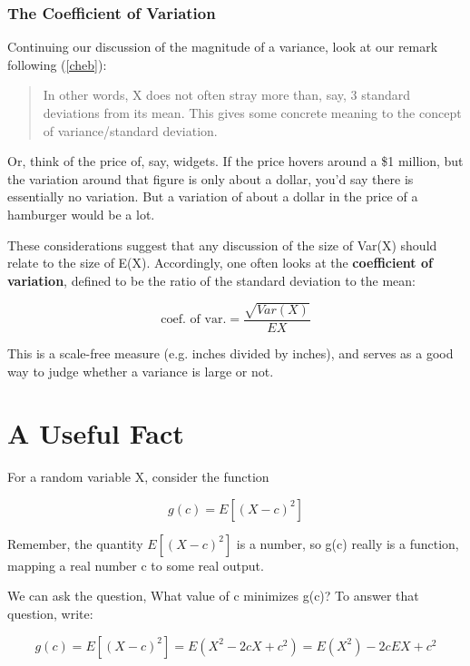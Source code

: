 \subsubsection{The Coefficient of Variation}

Continuing our discussion of the magnitude of a variance, look at our
remark following (\ref{cheb}):

\begin{quote}
In other words, X does not often stray more than, say, 3 standard
deviations from its mean.  This gives some concrete meaning to the
concept of variance/standard deviation.
\end{quote}

Or, think of the price of, say, widgets.  If the price hovers around a
\$1 million, but the variation around that figure is only about a
dollar, you'd say there is essentially no variation.  But a variation
of about a dollar in the price of a hamburger would be a lot.

These considerations suggest that any discussion of the size of Var(X)
should relate to the size of E(X).  Accordingly, one often looks at the
{\bf coefficient of variation}, defined to be the ratio of the standard
deviation to the mean:

\begin{equation}
\textrm{coef. of var.} = \frac{\sqrt{Var(X)}}{EX}
\end{equation}

This is a scale-free measure (e.g. inches divided by inches), and serves
as a good way to judge whether a variance is large or not.

\section{A Useful Fact}
\label{usefulfact}

\label{mingcpage}
For a random variable X, consider the function

\begin{equation}
g(c) = E[(X-c)^2]
\end{equation}

Remember, the quantity $E[(X-c)^2]$ is a number, so g(c) really is a
function, mapping a real number c to some real output.  

We can ask the question, What value of c minimizes g(c)?  To answer that
question, write:

\begin{equation}
\label{gofc}
g(c) = E[(X-c)^2] = E(X^2 -2cX + c^2) = E(X^2) - 2c EX + c^2
\end{equation}

